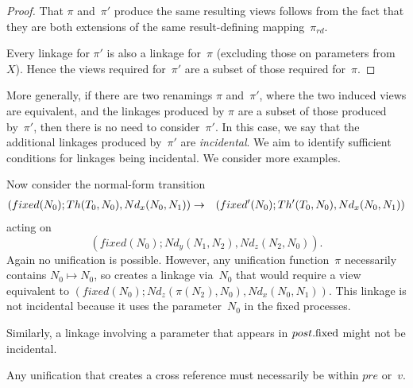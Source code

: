 
\begin{proof}
That $\pi$ and~$\pi'$ produce the same resulting views follows from the fact
that they are both extensions of the same result-defining mapping~$\pi_{rd}$. 

Every linkage for $\pi'$ is also a linkage for~$\pi$ (excluding those on
parameters from~$X$).  Hence the views required for~$\pi'$ are a subset of
those required for~$\pi$. 
\end{proof}





More generally, if there are two renamings $\pi$ and~$\pi'$, where the two
induced views are equivalent, and the linkages produced by $\pi$ are a subset
of those produced by~$\pi'$, then there is no need to consider~$\pi'$.  In
this case, we say that the additional linkages produced by~$\pi'$ are
\emph{incidental}.  We aim to identify sufficient conditions for linkages
being incidental.  We consider more examples.


\begin{example}\label{example:30}
Now consider the normal-form transition
\begin{eqnarray*}
(fixed(N_0); Th(T_0,N_0), Nd_x(N_0,N_1)) & \stackrel{}\rightarrow &
  (fixed'(N_0); Th'(T_0,N_0), Nd_x(N_0,N_1))
\end{eqnarray*}
acting on 
\[
(fixed(N_0); Nd_y(N_1,N_2), Nd_z(N_2,N_0)).
\]
Again no unification is possible.  However, any unification function~$\pi$
necessarily contains $N_0 \mapsto N_0$, so creates a linkage via~$N_0$ that
would require a view equivalent to $(fixed(N_0); Nd_z(\pi(N_2),N_0),
Nd_x(N_0,N_1))$.  This linkage is not incidental because it uses the
parameter~$N_0$ in the fixed processes.
\end{example}


Similarly, a linkage involving a parameter that appears in $post.\mathrm{fixed}$ might
not be incidental.  
%

\framebox{***} Any unification that creates a cross reference must necessarily
be within $pre$ or~$v$.


